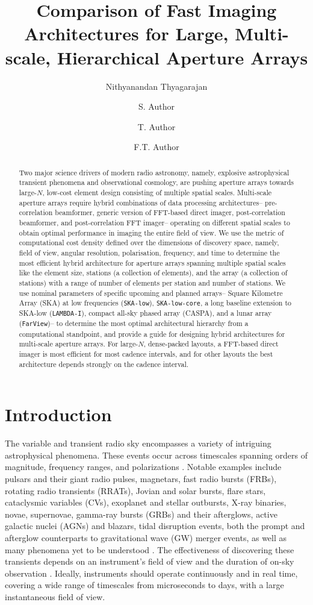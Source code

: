 \documentclass[
  journal=pasa,
  manuscript=article-type,
  year=2020,
  volume=37,
]{cup-journal}
\title{Comparison of Fast Imaging Architectures for Large, Multi-scale, Hierarchical Aperture Arrays}
\author{Nithyanandan Thyagarajan}
\affiliation{CSIRO, Space \& Astronomy, P. O. Box 1130, Bentley, WA 6102, Australia}
\author{S. Author}
\affiliation{Second Division, Organization, City, Pincode, State, Country}
\author{T. Author}
\affiliation{Second Division, Organization, City, Pincode, State, Country}
\author{F.T. Author}
\affiliation{Fourth Division, Organization, City, Pincode, State, Country}
\begin{document}
\begin{abstract}
Two major science drivers of modern radio astronomy, namely, explosive astrophysical transient phenomena and observational cosmology, are pushing aperture arrays towards large-$N$, low-cost element design consisting of multiple spatial scales. Multi-scale aperture arrays require hybrid combinations of data processing architectures-- pre-correlation beamformer, generic version of FFT-based direct imager, post-correlation beamformer, and post-correlation FFT imager-- operating on different spatial scales to obtain optimal performance in imaging the entire field of view. We use the metric of computational cost density defined over the dimensions of discovery space, namely, field of view, angular resolution, polarisation, frequency, and time to determine the most efficient hybrid architecture for aperture arrays spanning multiple spatial scales like the element size, stations (a collection of elements), and the array (a collection of stations) with a range of number of elements per station and number of stations. We use nominal parameters of specific upcoming and planned arrays-- Square Kilometre Array (SKA) at low frequencies (\texttt{SKA-low}), \texttt{SKA-low-core}, a long baseline extension to SKA-low (\texttt{LAMBDA-I}), compact all-sky phased array (CASPA), and a lunar array (\texttt{FarView})-- to determine the most optimal architectural hierarchy from a computational standpoint, and provide a guide for designing hybrid architectures for multi-scale aperture arrays. For large-$N$, dense-packed layouts, a FFT-based direct imager is most efficient for most cadence intervals, and for other layouts the best architecture depends strongly on the cadence interval.
\end{abstract}

\section{Introduction}

The variable and transient radio sky encompasses a variety of intriguing astrophysical phenomena. These events occur across timescales spanning orders of magnitude, frequency ranges, and polarizations \citep[][and references therein]{Pietka+2015,Chandra+2016}. Notable examples include pulsars and their giant radio pulses, magnetars, fast radio bursts (FRBs), rotating radio transients (RRATs), Jovian and solar bursts, flare stars, cataclysmic variables (CVs), exoplanet and stellar outbursts, X-ray binaries, novae, supernovae, gamma-ray bursts (GRBs) and their afterglows, active galactic nuclei (AGNs) and blazars, tidal disruption events, both the prompt and afterglow counterparts to gravitational wave (GW) merger events, as well as many phenomena yet to be understood \citep{Lorimer+2007,Thyagarajan+2011,Keane2013,Thornton+2013,Bochenek+2020}.  The effectiveness of discovering these transients depends on an instrument's field of view and the duration of on-sky observation \citep{Cordes2007}. Ideally, instruments should operate continuously and in real time, covering a wide range of timescales from microseconds to days, with a large instantaneous field of view. 
\end{document}
